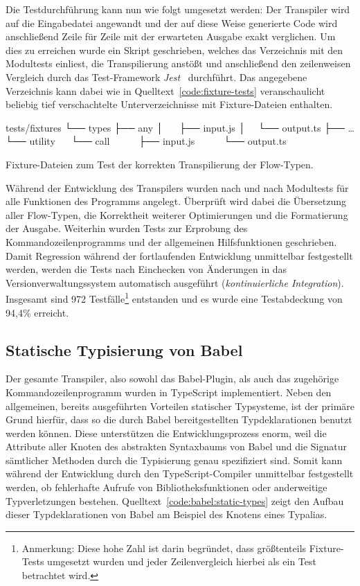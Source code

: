 Die Testdurchführung kann nun wie folgt umgesetzt werden: Der Transpiler wird auf die Eingabedatei angewandt und der auf diese Weise generierte Code wird anschließend Zeile für Zeile mit der erwarteten Ausgabe exakt verglichen. Um dies zu erreichen wurde ein Skript geschrieben, welches das Verzeichnis mit den Modultests einliest, die Transpilierung anstößt und anschließend den zeilenweisen Vergleich durch das Test-Framework \textit{Jest}~\autocite{SOFTWARE:JEST} durchführt. Das angegebene Verzeichnis kann dabei wie in Quelltext~\ref{code:fixture-tests} veranschaulicht beliebig tief verschachtelte Unterverzeichnisse mit Fixture-Dateien enthalten.

\bigbreak
\begin{listing}[htb]
\begin{textcode}
tests/fixtures
└── types
    ├── any
    │     ├── input.js
    │     └── output.ts
    ├── …
    └── utility
        └── call
            ├── input.js
            └── output.ts
\end{textcode}
\listingvspace
\caption{Fixture-Dateien zum Test der korrekten Transpilierung der Flow-Typen.}
\label{code:fixture-tests}
\end{listing}

Während der Entwicklung des Transpilers wurden nach und nach Modultests für alle Funktionen des Programms angelegt. Überprüft wird dabei die Übersetzung aller Flow-Typen, die Korrektheit weiterer Optimierungen und die Formatierung der Ausgabe. Weiterhin wurden Tests zur Erprobung des Kommandozeilenprogramms und der allgemeinen Hilfsfunktionen geschrieben. Damit Regression während der fortlaufenden Entwicklung unmittelbar festgestellt werden, werden die Tests nach Einchecken von Änderungen in das Versionverwaltungssystem automatisch ausgeführt (\textit{kontinuierliche Integration}). Insgesamt sind 972 Testfälle\footnote{Anmerkung: Diese hohe Zahl ist darin begründet, dass größtenteils Fixture-Tests umgesetzt wurden und jeder Zeilenvergleich hierbei als ein Test betrachtet wird.} entstanden und es wurde eine Testabdeckung von 94,4\% erreicht.

\subsection{Statische Typisierung von Babel}

Der gesamte Transpiler, also sowohl das Babel-Plugin, als auch das zugehörige Kommandozeilenprogramm wurden in TypeScript implementiert. Neben den allgemeinen, bereits ausgeführten Vorteilen statischer Typsysteme, ist der primäre Grund hierfür, dass so die durch Babel bereitgestellten Typdeklarationen benutzt werden können. Diese unterstützen die Entwicklungsprozess enorm, weil die Attribute aller Knoten des abstrakten Syntaxbaums von Babel und die Signatur sämtlicher Methoden durch die Typisierung genau spezifiziert sind. Somit kann während der Entwicklung durch den TypeScript-Compiler unmittelbar festgestellt werden, ob fehlerhafte Aufrufe von Bibliotheksfunktionen oder anderweitige Typverletzungen bestehen. Quelltext~\ref{code:babel:static-types} zeigt den Aufbau dieser Typdeklarationen von Babel am Beispiel des Knotens eines Typalias.


